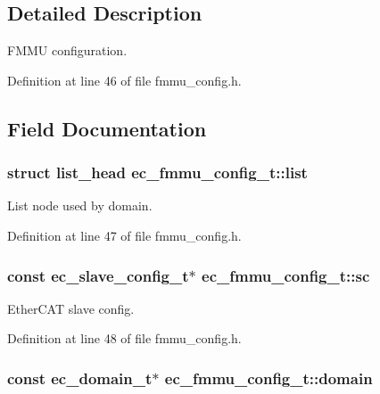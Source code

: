\subsection{\-Detailed \-Description}
\-F\-M\-M\-U configuration. 

\-Definition at line 46 of file fmmu\-\_\-config.\-h.



\subsection{\-Field \-Documentation}
\subsubsection[{list}]{\setlength{\rightskip}{0pt plus 5cm}struct list\-\_\-head {\bf ec\-\_\-fmmu\-\_\-config\-\_\-t\-::list}}\label{structec__fmmu__config__t_add81ada7f3febb9faf5c068a8f81b28a}


\-List node used by domain. 



\-Definition at line 47 of file fmmu\-\_\-config.\-h.

\subsubsection[{sc}]{\setlength{\rightskip}{0pt plus 5cm}const {\bf ec\-\_\-slave\-\_\-config\-\_\-t}$\ast$ {\bf ec\-\_\-fmmu\-\_\-config\-\_\-t\-::sc}}\label{structec__fmmu__config__t_a9833400867ab8e59c3eede3e47f8a8fb}


\-Ether\-C\-A\-T slave config. 



\-Definition at line 48 of file fmmu\-\_\-config.\-h.

\subsubsection[{domain}]{\setlength{\rightskip}{0pt plus 5cm}const {\bf ec\-\_\-domain\-\_\-t}$\ast$ {\bf ec\-\_\-fmmu\-\_\-config\-\_\-t\-::domain}}\label{structec__fmmu__config__t_a189c237bbb083b9ef1924673026de193}


